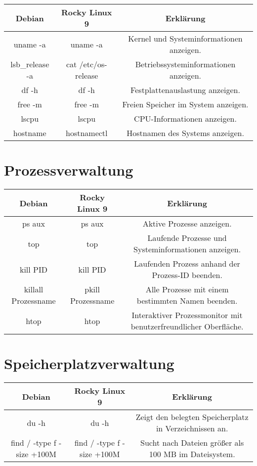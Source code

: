 \documentclass{article}
\begin{document}
\begin{tabularx}{\textwidth}{CCC}
  \textbf{Debian} & \textbf{Rocky Linux 9} & \textbf{Erklärung} \\
  \hline
  uname -a & uname -a & Kernel und Systeminformationen anzeigen. \\
  lsb\_release -a & cat /etc/os-release & Betriebssysteminformationen anzeigen. \\
  df -h & df -h & Festplattenauslastung anzeigen. \\
  free -m & free -m & Freien Speicher im System anzeigen. \\
  lscpu & lscpu & CPU-Informationen anzeigen. \\
  hostname & hostnamectl & Hostnamen des Systems anzeigen. \\
\end{tabularx}


\section*{Prozessverwaltung}

\begin{tabularx}{\textwidth}{CCC}
  \textbf{Debian} & \textbf{Rocky Linux 9} & \textbf{Erklärung} \\
  \hline
  ps aux & ps aux & Aktive Prozesse anzeigen. \\
  top & top & Laufende Prozesse und Systeminformationen anzeigen. \\
  kill PID & kill PID & Laufenden Prozess anhand der Prozess-ID beenden. \\
  killall Prozessname & pkill Prozessname & Alle Prozesse mit einem bestimmten Namen beenden. \\
  htop & htop & Interaktiver Prozessmonitor mit benutzerfreundlicher Oberfläche. \\
\end{tabularx}


\section*{Speicherplatzverwaltung}

\begin{tabularx}{\textwidth}{CCC}
  \textbf{Debian} & \textbf{Rocky Linux 9} & \textbf{Erklärung} \\
  \hline
  du -h & du -h & Zeigt den belegten Speicherplatz in Verzeichnissen an. \\
  find / -type f -size +100M & find / -type f -size +100M & Sucht nach Dateien größer als 100 MB im Dateisystem. \\
\end{tabularx}
\end{document}
